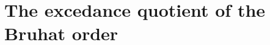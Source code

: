 \documentclass[12pt]{amsart}
\newtheorem{prop}[equation]{Proposition}
\newtheorem{lem}[equation]{Lemma}
\theoremstyle{definition}
\theoremstyle{remark}
\numberwithin{equation}{section}
\renewcommand{\setminus}{-}
\newcommand{\NCP}{\mathrm{NCP}}
\begin{document}
%
%
%
%
%

\section{The excedance quotient of the Bruhat order}
\label{sec:excedance}
\end{document}
